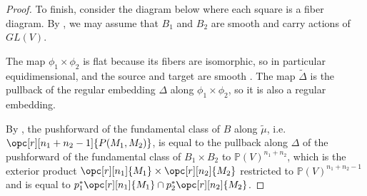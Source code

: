 \documentclass[12pt]{amsart}
\newcommand{\mb}{\mathbb}
\newcommand{\mc}{\mathcal}
\newcommand{\wt}{\widetilde}
\theoremstyle{plain}
\theoremstyle{definition}
\theoremstyle{remark}
\begin{document}
\begin{proof}

To finish, consider the diagram below where each square is a fiber diagram. By , we may assume that $B_1$ and $B_2$ are smooth and carry actions of $GL(V)$.
\begin{center}
\end{center}
The map $\phi_1\times \phi_2$ is flat because its fibers are isomorphic, so in particular equidimensional, and the source and target are smooth \cite[Tag 00R4]{stacks-project}. The map $\wt{\Delta}$ is the pullback of the regular embedding $\Delta$ along $\phi_1 \times \phi_2$, so it is also a regular embedding.

By \cite[Theorem~6.2]{Fulton}, the pushforward of the fundamental class of $B$ along $\wt\mu$, i.e. $\opc[r][n_1+n_2-1]{P(M_1,M_2)}$, is equal to the pullback along $\Delta$ of the pushforward of the fundamental class of $B_1 \times B_2$ to $\mb{P}(V)^{n_1+n_2}$, which is the exterior product $\opc[r][n_1]{M_1}\times \opc[r][n_2]{M_2}$ restricted to $\mb{P}(V)^{n_1+n_2-1}$ and is equal to $p_1^*\opc[r][n_1]{M_1} \cap p_2^*\opc[r][n_2]{M_2}$.
\end{proof}
\end{document}
